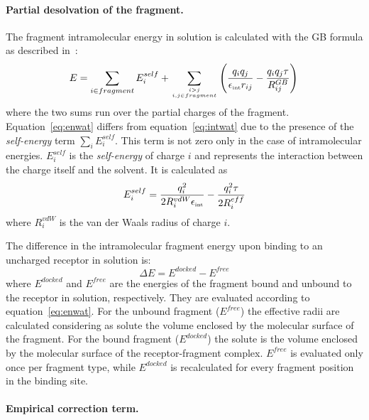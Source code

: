 \documentclass[a4paper,12pt,titlepage]{article}
\begin{document}
\paragraph{Partial desolvation of the fragment.}

The fragment intramolecular energy in solution is calculated with the 
GB formula as described in~\cite{Scarsi:Continuum}:
%
\begin{equation}
%
E = \sum_{i \in fragment} E^{self}_{i} 
+ \sum_{ {i > j} \atop{i,j \in fragment} } 
\left( \frac{q_i q_j}{\epsilon_{\mbox{\tiny int}} r_{ij}} - 
\frac{q_i q_j \tau}{R^{GB}_{ij}} \right)\\
\label{eq:enwat}
%
\end{equation}
%
where the two sums run over the partial charges of the fragment.
Equation~\ref{eq:enwat} differs from equation~\ref{eq:intwat} due to the 
presence of the {\it self-energy} term $\sum_{i} E^{self}_{i}$. This 
term is not zero only in the case of intramolecular energies. 
$E^{self}_{i}$ is the {\it self-energy} of charge $i$ and 
represents the interaction between the charge itself and the solvent. 
It is calculated as 
%
\begin{equation}
%
E^{self}_{i} = \frac{q^2_i}{2 R_{i}^{vdW} \epsilon_{\mbox{\tiny int}}}
- \frac{q^2_i \tau}{2 R^{eff}_{i}}
\label{eq:self}
%
\end{equation}
%
where $R_{i}^{vdW}$ is the van der Waals radius of charge $i$.

The difference in the intramolecular fragment energy upon binding 
to an uncharged receptor in solution is:
%
\begin{equation}
%
\Delta E = E^{docked} - E^{free}
\label{eq:frdeso}
%
\end{equation}
%
where $E^{docked}$ and $E^{free}$ are the energies of the fragment
bound and unbound to the receptor in solution, respectively. They are 
evaluated according to equation~\ref{eq:enwat}. For the unbound fragment 
($E^{free}$) the effective radii are calculated considering as solute the 
volume enclosed by the molecular surface of the fragment. 
For the bound fragment ($E^{docked}$) the solute is the volume enclosed by 
the molecular surface of the receptor-fragment complex. 
$E^{free}$ is evaluated only once per fragment type, while 
$E^{docked}$ is recalculated for every fragment position in the binding site.

\paragraph{Empirical correction term.}
\end{document}
